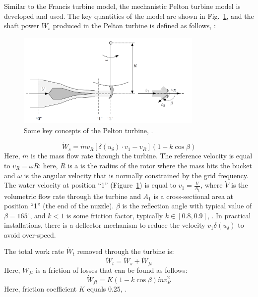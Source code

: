 \documentclass[%
]{USN-PhD}
\begin{document}
Similar to the Francis turbine model, the mechanistic Pelton turbine model is developed and used. The key quantities of the model are shown in Fig.~\ref{fig:fig14}, and the shaft power $\dot{W}_s$ produced in the Pelton turbine is defined as follows, \cite{LieL:18}:
\begin{figure}
\begin{center}
\includegraphics[width=0.8\textwidth]{fig/Pelton_turb} %
\caption{Some key concepts of the Pelton turbine, \cite{LieL:18}.}
\label{fig:fig14}
\end{center}
\end{figure}

\begin{equation}
\dot{W}_s=\dot{m}v_R\left[\delta(u_\delta)\cdot v_1-v_R\right]\left(1-k\cos\beta\right)
\end{equation}
Here, $\dot{m}$ is the mass flow rate through the turbine. The reference velocity is equal to $v_R = \omega R$: here, $R$ is a is the radius of the rotor where the mass hits the bucket and $\omega$ is the angular velocity that is normally constrained by the grid frequency. The water velocity at position ``1'' (Figure~\ref{fig:fig14}) is equal to $v_1=\frac{\dot{V}}{A_1}$, where $\dot{V}$ is the volumetric flow rate through the turbine and $A_1$ is a cross-sectional area at position ``1'' (the end of the nuzzle). $\beta$ is the reflection angle with typical value of $\beta= 165^{\circ}$, and $k<1$ is some friction factor, typically $k\in[0.8, 0.9]$, \cite{LieL:18}. In practical installations, there is a deflector mechanism to reduce the velocity $v_1\delta(u_\delta)$ to avoid over-speed.

The total work rate $\dot{W}_t$ removed through the turbine is:
\begin{equation} \label{eq:eq50}
{\dot{W}_t} = {\dot{W}_s+\dot{W}_{ft}}
\end{equation}
Here, $\dot{W}_{ft}$ is a friction of losses that can be found as follows:
\begin{equation}
\dot{W}_{ft}=K\left(1-k\cos\beta\right)\dot{m}v_R^2
\end{equation}
Here, friction coefficient $K$ equals 0.25, \cite{LieL:18}.
\end{document}
